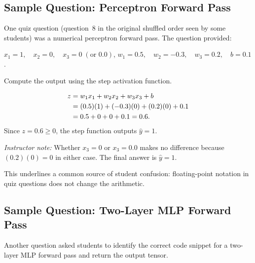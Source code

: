 \documentclass[12pt,a4paper]{article}
\begin{document}
\subsection{Sample Question: Perceptron Forward Pass}
\label{ssec:q_perceptron}

One quiz question (question~8 in the original shuffled order seen by
some students) was a numerical perceptron forward pass.  The question
provided:

\begin{center}
  $x_1 = 1,\quad x_2 = 0,\quad x_3 = 0\;(\text{or } 0.0)$,
  \quad $w_1 = 0.5,\quad w_2 = -0.3,\quad w_3 = 0.2,\quad b = 0.1$.
\end{center}

Compute the output using the step activation function.

\begin{example}
\begin{align}
  z &= w_1 x_1 + w_2 x_2 + w_3 x_3 + b \notag \\
    &= (0.5)(1) + (-0.3)(0) + (0.2)(0) + 0.1 \notag \\
    &= 0.5 + 0 + 0 + 0.1 = 0.6. \label{eq:perceptron_example}
\end{align}
Since $z = 0.6 \geq 0$, the step function outputs $\hat{y} = 1$.

\medskip
\noindent
\textit{Instructor note:} Whether $x_3 = 0$ or $x_3 = 0.0$ makes no
difference because $(0.2)(0) = 0$ in either case.  The final answer is
$\hat{y} = 1$.
\end{example}

\noindent
This underlines a common source of student confusion: floating-point
notation in quiz questions does not change the arithmetic.

\subsection{Sample Question: Two-Layer MLP Forward Pass}
\label{ssec:q_mlp}

Another question asked students to identify the correct code snippet
for a two-layer MLP forward pass and return the output tensor.
\end{document}
